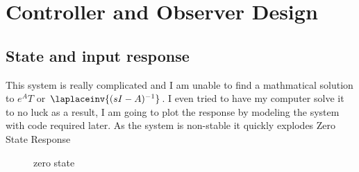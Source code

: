 \section{Controller and Observer Design}
\subsection{State and input response}

This system is really complicated and I am unable to find a mathmatical solution to $e^AT$
or $\laplaceinv{(sI-A)^{-1}}$. I even tried to have my computer solve it to no luck
as a result, I am going to plot the response by modeling the system with code required later.
As the system is non-stable it quickly explodes
Zero State Response
\begin{figure}[H]
  \begin{center}
  \end{center}
  \caption{zero state}
  \label{fig:zero_state}
\end{figure}


